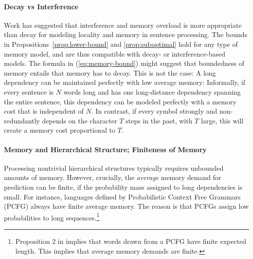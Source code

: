 \paragraph{Decay vs Interference}
Work has suggested that interference and memory overload is more appropriate than decay \cite[p. 408]{lewis-activation-based-2005} for modeling locality and memory in sentence processing.
The bounds in Propositions~\ref{prop:lower-bound} and \ref{prop:suboptimal} hold for any type of memory model, and are thus compatible with decay- or interference-based models.
The formula in (\ref{eq:memory-bound}) might suggest that boundedness of memory entails that memory has to decay.
This is not the case:
A long dependency can be maintained perfectly with low average memory:
Informally, if every sentence is $N$ words long and has one long-distance dependency spanning the entire sentence, this dependency can be modeled perfectly with a memory cost that is independent of $N$.
In contrast, if every symbol strongly and non-redundantly depends on the character $T$ steps in the past, with $T$ large, this will create a memory cost proportional to $T$.




\paragraph{Memory and Hierarchical Structure; Finiteness of Memory}
Processing nontrivial hierarchical structures typically requires unbounded amounts of memory.
However, crucially, the \emph{average} memory demand for prediction can be finite, if the probability mass assigned to long dependencies is small.
For instance, languages defined by Probabilistic Context Free Grammars (PCFG) always have finite average memory.
The reason is that PCFGs assign low probabilities to long sequences.\footnote{Proposition 2 in \cite{chi-statistical-1999} implies that words drawn from a PCFG have finite expected length. This implies that average memory demands are finite.}



